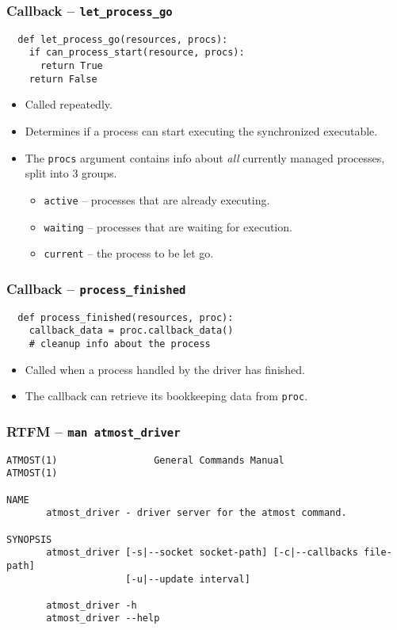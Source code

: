 \documentclass[compress,table,xcolor=table]{beamer}
\newcommand{\shelltext}[1]{\texttt{\colorbox{light-gray}{#1}}}
\begin{document}
\begin{frame}[fragile]
  \frametitle{Callback -- \shelltext{let\_process\_go}}
  \begin{lstlisting}
  def let_process_go(resources, procs):
    if can_process_start(resource, procs):
      return True
    return False
  \end{lstlisting}
  \begin{itemize}
    \Large
    \item Called repeatedly.
    \item Determines if a process can start executing the synchronized executable.
    \item The \shelltext{procs} argument contains info about {\em all} currently
      managed processes, split into 3 groups.
    \begin{itemize}
      \large
      \item \shelltext{active} -- processes that are already executing.
      \item \shelltext{waiting} -- processes that are waiting for execution.
      \item \shelltext{current} -- the process to be let go.
    \end{itemize}
  \end{itemize}
\end{frame}
\begin{frame}[fragile]
  \frametitle{Callback -- \shelltext{process\_finished}}
  \begin{lstlisting}
  def process_finished(resources, proc):
    callback_data = proc.callback_data()
    # cleanup info about the process
  \end{lstlisting}
  \begin{itemize}
    \Large
    \item Called when a process handled by the driver has finished.
    \item The callback can retrieve its bookkeeping data from \shelltext{proc}.
  \end{itemize}
\end{frame}
\begin{frame}[fragile]
  \frametitle{RTFM -- \shelltext{man atmost\_driver}}
\scriptsize
\begin{verbatim}
ATMOST(1)                 General Commands Manual                ATMOST(1)

NAME
       atmost_driver - driver server for the atmost command.

SYNOPSIS
       atmost_driver [-s|--socket socket-path] [-c|--callbacks file-path]
                     [-u|--update interval]

       atmost_driver -h
       atmost_driver --help
\end{verbatim}
\end{frame}
\end{document}

